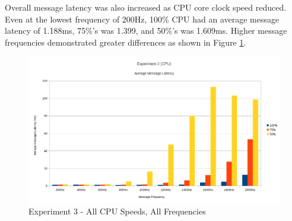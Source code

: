 \documentclass[../dissertation.tex]{subfiles}
\begin{document}
Overall message latency was also increased as CPU core clock speed reduced. Even at the lowest frequency of 200Hz, 100\% CPU had an average message latency of 1.188ms, 75\%'s was 1.399, and 50\%'s was 1.609ms. Higher message frequencies demonstrated greater differences as shown in Figure \ref{exp3-averages}.

\begin{figure}[h]
\centering
\includegraphics[width=\textwidth]{images/experiment3/average_per_frequency_graph.png}
\caption{Experiment 3 - All CPU Speeds, All Frequencies}
\label{exp3-averages}
\end{figure}
\end{document}

